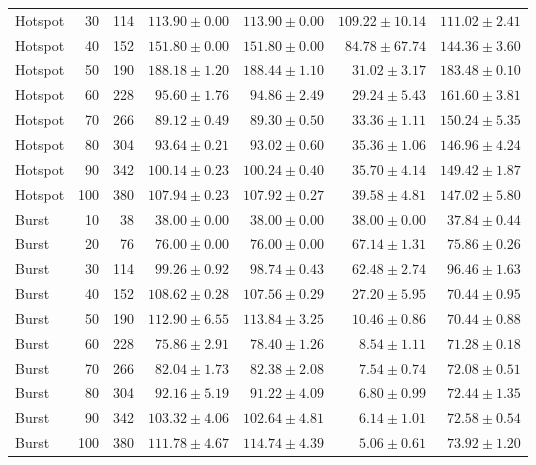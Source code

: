 \begin{table}[htbp]
\begin{tabular*}{\linewidth}{@{\extracolsep{\fill}}lrrrrrr}
Hotspot & 30 & 114 & $113.90 \pm 0.00$ & $113.90 \pm 0.00$ & $109.22 \pm 10.14$ & $111.02 \pm 2.41$\\
Hotspot & 40 & 152 & $151.80 \pm 0.00$ & $151.80 \pm 0.00$ & $84.78 \pm 67.74$ & $144.36 \pm 3.60$\\
Hotspot & 50 & 190 & $188.18 \pm 1.20$ & $188.44 \pm 1.10$ & $31.02 \pm 3.17$ & $183.48 \pm 0.10$\\
Hotspot & 60 & 228 & $95.60 \pm 1.76$ & $94.86 \pm 2.49$ & $29.24 \pm 5.43$ & $161.60 \pm 3.81$\\
Hotspot & 70 & 266 & $89.12 \pm 0.49$ & $89.30 \pm 0.50$ & $33.36 \pm 1.11$ & $150.24 \pm 5.35$\\
Hotspot & 80 & 304 & $93.64 \pm 0.21$ & $93.02 \pm 0.60$ & $35.36 \pm 1.06$ & $146.96 \pm 4.24$\\
Hotspot & 90 & 342 & $100.14 \pm 0.23$ & $100.24 \pm 0.40$ & $35.70 \pm 4.14$ & $149.42 \pm 1.87$\\
Hotspot & 100 & 380 & $107.94 \pm 0.23$ & $107.92 \pm 0.27$ & $39.58 \pm 4.81$ & $147.02 \pm 5.80$\\
\midrule
Burst & 10 & 38 & $38.00 \pm 0.00$ & $38.00 \pm 0.00$ & $38.00 \pm 0.00$ & $37.84 \pm 0.44$\\
Burst & 20 & 76 & $76.00 \pm 0.00$ & $76.00 \pm 0.00$ & $67.14 \pm 1.31$ & $75.86 \pm 0.26$\\
Burst & 30 & 114 & $99.26 \pm 0.92$ & $98.74 \pm 0.43$ & $62.48 \pm 2.74$ & $96.46 \pm 1.63$\\
Burst & 40 & 152 & $108.62 \pm 0.28$ & $107.56 \pm 0.29$ & $27.20 \pm 5.95$ & $70.44 \pm 0.95$\\
Burst & 50 & 190 & $112.90 \pm 6.55$ & $113.84 \pm 3.25$ & $10.46 \pm 0.86$ & $70.44 \pm 0.88$\\
Burst & 60 & 228 & $75.86 \pm 2.91$ & $78.40 \pm 1.26$ & $8.54 \pm 1.11$ & $71.28 \pm 0.18$\\
Burst & 70 & 266 & $82.04 \pm 1.73$ & $82.38 \pm 2.08$ & $7.54 \pm 0.74$ & $72.08 \pm 0.51$\\
Burst & 80 & 304 & $92.16 \pm 5.19$ & $91.22 \pm 4.09$ & $6.80 \pm 0.99$ & $72.44 \pm 1.35$\\
Burst & 90 & 342 & $103.32 \pm 4.06$ & $102.64 \pm 4.81$ & $6.14 \pm 1.01$ & $72.58 \pm 0.54$\\
Burst & 100 & 380 & $111.78 \pm 4.67$ & $114.74 \pm 4.39$ & $5.06 \pm 0.61$ & $73.92 \pm 1.20$\\
\bottomrule\end{tabular*}\end{table}
\clearpage
